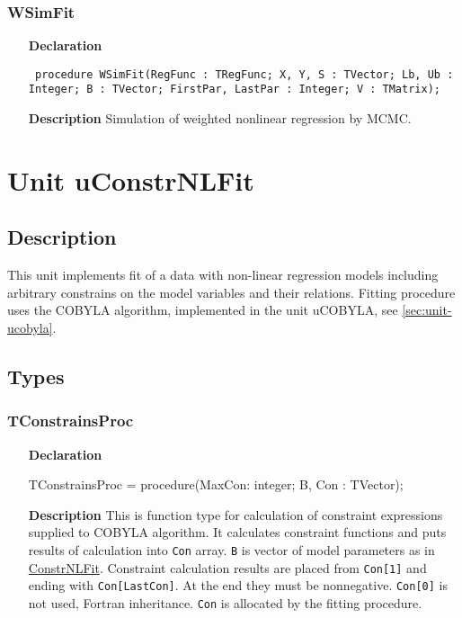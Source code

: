 \documentclass[12pt,a4paper,oneside]{report}
\newcommand{\lmatha}[1]{   %
	\marginpar{\vspace{#1} 
		\begin{flushright}
			LMath 0.5
	\end{flushright} }
}
\newcommand{\declarationitem}[1]{\textbf{#1}}
\newcommand{\descriptiontitle}[1]{\textbf{#1}}
\newcommand{\code}[1]{\texttt{#1}}
\begin{document}
\subsubsection{WSimFit}
\label{unlfit-WSimFit}
\begin{itemize}\item[\declarationitem{Declaration}\hfill]
	\begin{flushleft}
		\code{
			procedure WSimFit(RegFunc : TRegFunc; X, Y, S : TVector; Lb, Ub : Integer; B : TVector; FirstPar, LastPar : Integer; V : TMatrix);}
		
	\end{flushleft}
	
	\par
	\item[\descriptiontitle{Description}]
	Simulation of weighted nonlinear regression by MCMC.
\end{itemize}

\section{Unit uConstrNLFit}\label{sec:unit-uconstrnlfit}
\subsection{Description}\lmatha{-50pt}
This unit implements fit of a data with non-linear regression models including arbitrary constrains on the model variables and their relations. Fitting procedure uses the COBYLA algorithm, implemented in the unit uCOBYLA, see \ref{sec:unit-ucobyla}. 
\subsection{Types}
\subsubsection{TConstrainsProc}
\label{uconstrnlfit:tconstrainsproc}
\begin{itemize}
\item[\declarationitem{Declaration}\hfill]
\begin{flushleft}
	TConstrainsProc = procedure(MaxCon: integer; B, Con : TVector);
\end{flushleft}
\item[\descriptiontitle{Description}]
This is function type for calculation of constraint expressions supplied to COBYLA algorithm. It calculates constraint functions and puts results of calculation into \code{Con} array. \code{B} is vector of model parameters as in \hyperref[uconstrnlfit-constrnlfit]{ConstrNLFit}. Constraint calculation results are placed from \code{Con[1]} and ending with \code{Con[LastCon]}. At the end they must be nonnegative.
\code{Con[0]} is not used, Fortran inheritance. \code{Con} is allocated by the fitting procedure.
\end{itemize}
\end{document}
